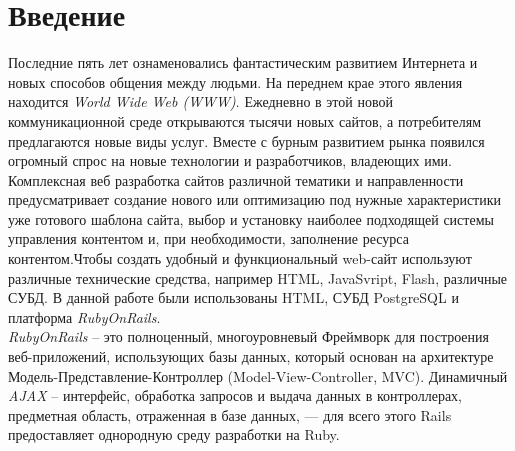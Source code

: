 ﻿\section{Введение}
Последние пять лет ознаменовались фантастическим развитием Интернета и новых способов общения между людьми. На переднем крае этого явления находится \textit{World Wide Web (WWW)}. Ежедневно в этой новой коммуникационной среде открываются тысячи новых сайтов, а потребителям предлагаются новые виды услуг. Вместе с бурным развитием рынка появился огромный спрос на новые технологии и разработчиков, владеющих ими. Комплексная веб разработка сайтов различной тематики и направленности предусматривает создание нового или оптимизацию под нужные характеристики уже готового шаблона сайта, выбор и установку наиболее подходящей системы управления контентом и, при необходимости, заполнение ресурса контентом.Чтобы создать удобный и функциональный web-сайт используют различные технические средства, например HTML,  JavaSvript, Flash, различные СУБД. В данной работе были использованы HTML, СУБД PostgreSQL и платформа \textit{RubyOnRails}.\\

\hspace*{0.5cm}\textit{RubyOnRails} -- это полноценный, многоуровневый Фреймворк для построения веб-приложений, использующих базы данных, который основан на архитектуре Модель-Представление-Контроллер (Model-View-Controller, MVC). Динамичный \textit{AJAX} -- интерфейс, обработка запросов и выдача данных в контроллерах, предметная область, отраженная в базе данных, — для всего этого Rails предоставляет однородную среду разработки на Ruby.\\

\endinput

